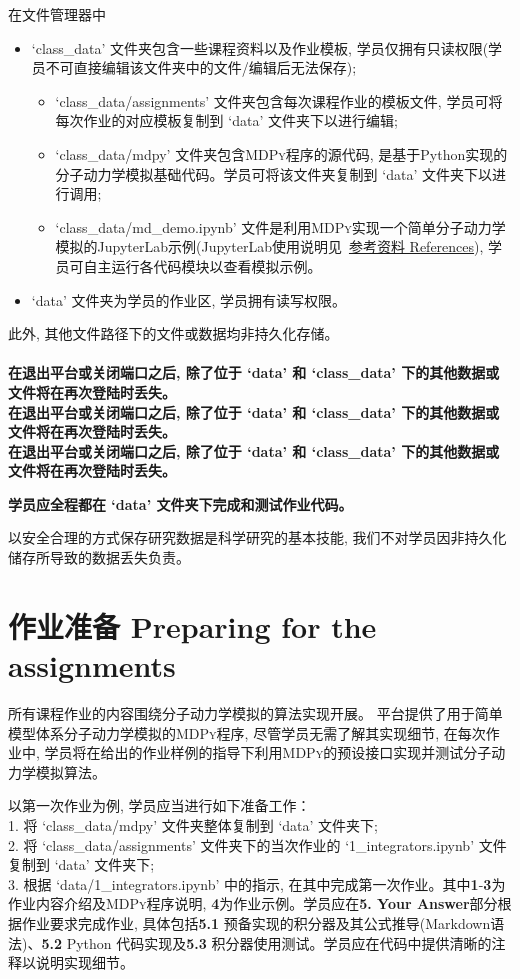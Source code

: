 \documentclass{article}
\begin{document}
在文件管理器中
\begin{itemize}
  \item `class\_data' 文件夹包含一些课程资料以及作业模板, 学员仅拥有只读权限(学员不可直接编辑该文件夹中的文件/编辑后无法保存);
    \begin{itemize}
      \item `class\_data/assignments' 文件夹包含每次课程作业的模板文件, 学员可将每次作业的对应模板复制到 `data' 文件夹下以进行编辑;
      \item `class\_data/mdpy' 文件夹包含\textsc{MDPy}程序的源代码, 是基于Python实现的分子动力学模拟基础代码。学员可将该文件夹复制到 `data' 文件夹下以进行调用;
      \item `class\_data/md\_demo.ipynb' 文件是利用\textsc{MDPy}实现一个简单分子动力学模拟的JupyterLab示例(JupyterLab使用说明见~\hyperref[sec:ref]{\color{myred}参考资料 References}), 学员可自主运行各代码模块以查看模拟示例。
    \end{itemize}
  \item `data' 文件夹为学员的作业区, 学员拥有读写权限。
\end{itemize}

此外, 其他文件路径下的文件或数据均非持久化存储。\\\\
{\bf
\color{myred} 在退出平台或关闭端口之后, 除了位于 `data' 和 `class\_data' 下的其他数据或文件将在再次登陆时丢失。\\
\color{myblue}在退出平台或关闭端口之后, 除了位于 `data' 和 `class\_data' 下的其他数据或文件将在再次登陆时丢失。\\
\color{myred} 在退出平台或关闭端口之后, 除了位于 `data' 和 `class\_data' 下的其他数据或文件将在再次登陆时丢失。}

{\bf 学员应全程都在 `data' 文件夹下完成和测试作业代码。}

以安全合理的方式保存研究数据是科学研究的基本技能, 我们不对学员因非持久化储存所导致的数据丢失负责。

\section*{作业准备 Preparing for the assignments}

所有课程作业的内容围绕分子动力学模拟的算法实现开展。
平台提供了用于简单模型体系分子动力学模拟的\textsc{MDPy}程序, 尽管学员无需了解其实现细节, 在每次作业中, 学员将在给出的作业样例的指导下利用\textsc{MDPy}的预设接口实现并测试分子动力学模拟算法。

以第一次作业为例, 学员应当进行如下准备工作：\\
1. 将 `class\_data/mdpy' 文件夹整体复制到 `data' 文件夹下;\\
2. 将 `class\_data/assignments' 文件夹下的当次作业的 `1\_integrators.ipynb' 文件复制到 `data' 文件夹下;\\
3. 根据 `data/1\_integrators.ipynb' 中的指示, 在其中完成第一次作业。其中\textbf{1}-\textbf{3}为作业内容介绍及\textsc{MDPy}程序说明, \textbf{4}为作业示例。学员应在\textbf{5. Your Answer}部分根据作业要求完成作业, 具体包括\textbf{5.1} 预备实现的积分器及其公式推导(Markdown语法)、\textbf{5.2} Python 代码实现及\textbf{5.3} 积分器使用测试。学员应在代码中提供清晰的注释以说明实现细节。\\
\end{document}
